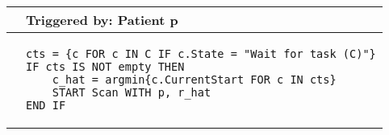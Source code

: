 \begin{tabular}{@{}>{\raggedright\arraybackslash}p{0.25cm}>{\raggedright\arraybackslash}p{13cm}@{}}
  \toprule
   & Triggered by: Patient p\\ \midrule 
  &
\begin{lstlisting}[language=CMPseudo]
cts = {c FOR c IN C IF c.State = "Wait for task (C)"}
IF cts IS NOT empty THEN 
    c_hat = argmin{c.CurrentStart FOR c IN cts}
    START Scan WITH p, r_hat
END IF
  \end{lstlisting}
  \\ \bottomrule
  \end{tabular}